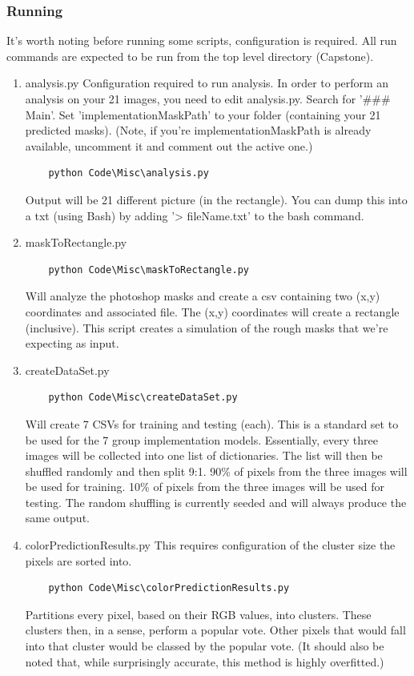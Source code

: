 \documentclass[10pt,journal,compsoc, draftclsnofoot,onecolumn]{IEEEtran}
\begin{document}
\subsubsection{Running}
It's worth noting before running some scripts, configuration is required.
All run commands are expected to be run from the top level directory (Capstone).

\begin{enumerate}
\item analysis.py
Configuration required to run analysis.
In order to perform an analysis on your 21 images, you need to edit analysis.py.
Search for '\#\#\# Main'.
Set 'implementationMaskPath' to your folder (containing your 21 predicted masks).
(Note, if you're implementationMaskPath is already available, uncomment it and comment out the active one.)
\begin{verbatim}
    python Code\Misc\analysis.py
\end{verbatim}
Output will be 21 different picture (in the rectangle).
You can dump this into a txt (using Bash) by adding '> fileName.txt' to the bash command.

\item maskToRectangle.py
\begin{verbatim}
    python Code\Misc\maskToRectangle.py
\end{verbatim}
Will analyze the photoshop masks and create a csv containing two (x,y) coordinates and associated file.
The (x,y) coordinates will create a rectangle (inclusive).
This script creates a simulation of the rough masks that we're expecting as input.

\item createDataSet.py
\begin{verbatim}
    python Code\Misc\createDataSet.py
\end{verbatim}
Will create 7 CSVs for training and testing (each).
This is a standard set to be used for the 7 group implementation models.
Essentially, every three images will be collected into one list of dictionaries.
The list will then be shuffled randomly and then split 9:1.
90\% of pixels from the three images will be used for training.
10\% of pixels from the three images will be used for testing.
The random shuffling is currently seeded and will always produce the same output.

\item colorPredictionResults.py
This requires configuration of the cluster size the pixels are sorted into.
\begin{verbatim}
    python Code\Misc\colorPredictionResults.py
\end{verbatim}
Partitions every pixel, based on their RGB values, into clusters.
These clusters then, in a sense, perform a popular vote.
Other pixels that would fall into that cluster would be classed by the popular vote.
(It should also be noted that, while surprisingly accurate, this method is highly overfitted.)
\end{enumerate}
\end{document}
